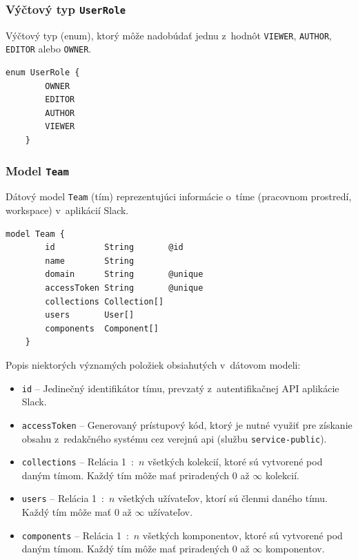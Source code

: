 \subsubsection{Výčtový typ \texttt{UserRole}}
Výčtový typ (enum), ktorý môže nadobúdať jednu z~hodnôt \texttt{VIEWER}, \texttt{AUTHOR}, \texttt{EDITOR} alebo \texttt{OWNER}. \\

\begin{lstlisting}[caption=Výčtový typ \texttt{UserRole} v~konfiguračnom súbore \texttt{prisma}.]
	enum UserRole {
		OWNER
		EDITOR
		AUTHOR
		VIEWER
	}
\end{lstlisting}

\subsubsection{Model \texttt{Team}}
Dátový model \texttt{Team} (tím) reprezentujúci informácie o~tíme (pracovnom prostredí, workspace) v~aplikácií Slack. \\

\begin{lstlisting}[caption=Dátový model \texttt{Team} v~konfiguračnom súbore \texttt{prisma}.]
	model Team {
		id          String       @id
		name        String
		domain      String       @unique
		accessToken String       @unique
		collections Collection[]
		users       User[]
		components  Component[]
	}
\end{lstlisting}

\medskip

\noindent Popis niektorých významých položiek obsiahutých v~dátovom modeli:

\begin{itemize}
	\item \texttt{id} -- Jedinečný identifikátor tímu, prevzatý z~autentifikačnej API aplikácie Slack.
	\item \texttt{accessToken} -- Generovaný prístupový kód, ktorý je nutné využiť pre získanie obsahu z~redakčného systému cez verejnú api (službu \texttt{service-public}). 
	\item \texttt{collections} -- Relácia 1~:~$n$ všetkých kolekcií, ktoré sú vytvorené pod daným tímom. Každý tím môže mať priradených 0 až $\infty$ kolekcií.
	\item \texttt{users} -- Relácia 1~:~$n$ všetkých užívateľov, ktorí sú členmi daného tímu. Každý tím môže mať 0 až $\infty$ užívateľov.
	\item \texttt{components} -- Relácia 1~:~$n$ všetkých komponentov, ktoré sú vytvorené pod daným tímom. Každý tím môže mať priradených 0 až $\infty$ komponentov.
\end{itemize}

